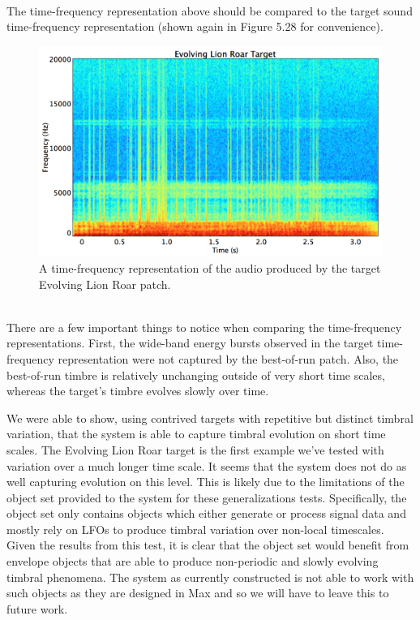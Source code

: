 \documentclass[12pt]{report} 	%
\numberwithin{figure}{chapter}
\numberwithin{table}{chapter}
\numberwithin{equation}{chapter}
\begin{document}
\begin{flushleft}
\begin{figure}[h!]
\begin{center}
\end{center}
\end{figure}
\\
The time-frequency representation above should be compared to the target sound time-frequency representation (shown again in Figure 5.28 for convenience).
\begin{figure}[h!]
\begin{center}
\includegraphics[scale=0.35,width=\linewidth]{EvolvingLionRoarTargetSTFT}
\caption[Target evolving lion roar time-frequency representation]{A time-frequency representation of the audio produced by the target Evolving Lion Roar patch.}
\end{center}
\end{figure}
\\
There are a few important things to notice when comparing the time-frequency representations. First, the wide-band energy bursts observed in the target time-frequency representation were not captured by the best-of-run patch. Also, the best-of-run timbre is relatively unchanging outside of very short time scales, whereas the target's timbre evolves slowly over time. 

We were able to show, using contrived targets with repetitive but distinct timbral variation, that the system is able to capture timbral evolution on short time scales. The Evolving Lion Roar target is the first example we've tested with variation over a much longer time scale. It seems that the system does not do as well capturing evolution on this level. This is likely due to the limitations of the object set provided to the system for these generalizations tests. Specifically, the object set only contains objects which either generate or process signal data and mostly rely on LFOs to produce timbral variation over non-local timescales. Given the results from this test, it is clear that the object set would benefit from envelope objects that are able to produce non-periodic and slowly evolving timbral phenomena. The system as currently constructed is not able to work with such objects as they are designed in Max and so we will have to leave this to future work.


\end{flushleft}
\end{document}
